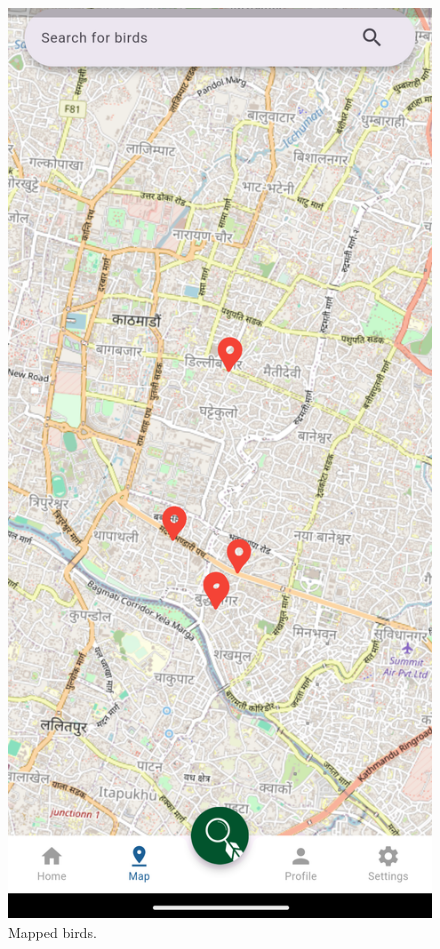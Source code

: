   \begin{figure}[h!]
      \centering
      \includegraphics[scale=0.26]{images/mappage.png}
      \caption{Mapped birds.}
  \end{figure}
